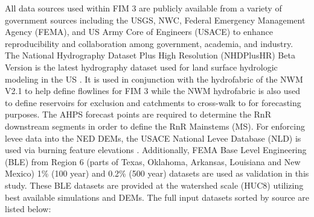 All data sources used within FIM 3 are publicly available from a variety of government sources including the USGS, NWC, Federal Emergency Management Agency (FEMA), and US Army Core of Engineers (USACE) to enhance reproducibility and collaboration among government, academia, and industry.
The National Hydrography Dataset Plus High Resolution (NHDPlusHR) Beta Version is the latest hydrography dataset used for land surface hydrologic modeling in the US \cite{moore2019user}. 
It is used in conjunction with the hydrofabric of the NWM V2.1 to help define flowlines for FIM 3 while the NWM hydrofabric is also used to define reservoirs for exclusion and catchments to cross-walk to for forecasting purposes.
The AHPS forecast points are required to determine the RnR downstream segments in order to define the RnR Mainstems (MS).
For enforcing levee data into the NED DEMs, the USACE National Levee Database (NLD) is used via burning feature elevations \cite{engineers2016national}.
Additionally, FEMA Base Level Engineering (BLE) from Region 6 (parts of Texas, Oklahoma, Arkansas, Louisiana and New Mexico) 1\% (100 year) and 0.2\% (500 year) datasets are used as validation in this study. 
These BLE datasets are provided at the watershed scale (HUC8) utilizing best available simulations and DEMs.
The full input datasets sorted by source are listed below:

